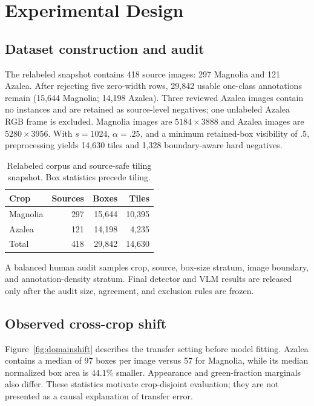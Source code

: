 \section{Experimental Design}
\subsection{Dataset construction and audit}
The relabeled snapshot contains 418 source images: 297 Magnolia and 121 Azalea. After rejecting five zero-width rows, 29,842 usable one-class annotations remain (15,644 Magnolia; 14,198 Azalea). Three reviewed Azalea images contain no instances and are retained as source-level negatives; one unlabeled Azalea RGB frame is excluded. Magnolia images are $5184\!\times\!3888$ and Azalea images are $5280\!\times\!3956$. With $s=1024$, $\alpha=.25$, and a minimum retained-box visibility of $.5$, preprocessing yields 14,630 tiles and 1,328 boundary-aware hard negatives.

\begin{table}[t]
\centering
\wacvtablefont
\caption{Relabeled corpus and source-safe tiling snapshot. Box statistics precede tiling.}
\label{tab:data}
\setlength{\tabcolsep}{5pt}
\begin{tabular}{lrrr}
\toprule
Crop & Sources & Boxes & Tiles \\
\midrule
Magnolia & 297 & 15,644 & 10,395 \\
Azalea & 121 & 14,198 & 4,235 \\
\midrule
Total & 418 & 29,842 & 14,630 \\
\bottomrule
\end{tabular}
\end{table}

A balanced human audit samples crop, source, box-size stratum, image boundary, and annotation-density stratum. Final detector and VLM results are released only after the audit size, agreement, and exclusion rules are frozen.

\subsection{Observed cross-crop shift}
Figure~\ref{fig:domainshift} describes the transfer setting before model fitting. Azalea contains a median of 97 boxes per image versus 57 for Magnolia, while its median normalized box area is $44.1\%$ smaller. Appearance and green-fraction marginals also differ. These statistics motivate crop-disjoint evaluation; they are not presented as a causal explanation of transfer error.

